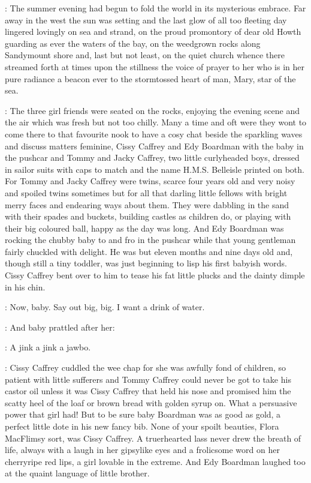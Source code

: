 :
The summer evening had begun to fold the world in its mysterious
embrace. Far away in the west the sun was setting and the last glow of all
too fleeting day lingered lovingly on sea and strand, on the proud
promontory of dear old Howth guarding as ever the waters of the bay, on
the weedgrown rocks along Sandymount shore and, last but not least, on the
quiet church whence there streamed forth at times upon the stillness the
voice of prayer to her who is in her pure radiance a beacon ever to the
stormtossed heart of man, Mary, star of the sea.

:
The three girl friends were seated on the rocks, enjoying the evening
scene and the air which was fresh but not too chilly. Many a time and oft
were they wont to come there to that favourite nook to have a cosy chat
beside the sparkling waves and discuss matters feminine, Cissy Caffrey and
Edy Boardman with the baby in the pushcar and Tommy and Jacky
Caffrey, two little curlyheaded boys, dressed in sailor suits with caps to
match and the name H.M.S. Belleisle printed on both. For Tommy and
Jacky Caffrey were twins, scarce four years old and very noisy and spoiled
twins sometimes but for all that darling little fellows with bright merry
faces and endearing ways about them. They were dabbling in the sand with
their spades and buckets, building castles as children do, or playing with
their big coloured ball, happy as the day was long. And Edy Boardman was
rocking the chubby baby to and fro in the pushcar while that young
gentleman fairly chuckled with delight. He was but eleven months and nine
days old and, though still a tiny toddler, was just beginning to lisp his
first babyish words. Cissy Caffrey bent over to him to tease his fat
little plucks and the dainty dimple in his chin.

\cissy:
Now, baby. Say out big, big. I want a drink of water.

:
And baby prattled after her:

\baby:
A jink a jink a jawbo.

:
Cissy Caffrey cuddled the wee chap for she was awfully fond of children,
so patient with little sufferers and Tommy Caffrey could never be got to
take his castor oil unless it was Cissy Caffrey that held his nose and
promised him the scatty heel of the loaf or brown bread with golden syrup
on. What a persuasive power that girl had! But to be sure baby Boardman
was as good as gold, a perfect little dote in his new fancy bib. None of
your spoilt beauties, Flora MacFlimsy sort, was Cissy Caffrey.
A truerhearted lass never drew the breath of life, always with a laugh in
her gipsylike eyes and a frolicsome word on her cherryripe red lips, a
girl lovable in the extreme. And Edy Boardman laughed too at the quaint
language of little brother.

